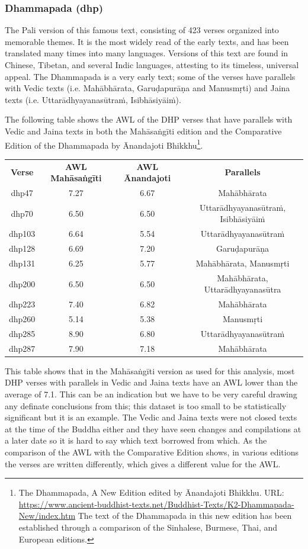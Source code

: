 \subsubsection{Dhammapada (dhp)}
The Pali version of this famous text, consisting of 423 verses organized into memorable themes. It is the most widely read of the early texts, and has been translated many times into many languages. Versions of this text are found in Chinese, Tibetan, and several Indic languages, attesting to its timeless, universal appeal. The Dhammapada is a very early text; some of the verses have parallels with Vedic texts (i.e. Mahābhārata, Garuḍapurāṇa and Manusmṛti) and Jaina texts (i.e. Uttarādhyayanasūtraṁ, Isibhāsiyāiṁ).

The following table shows the AWL of the DHP verses that have parallels with Vedic and Jaina texts in both the Mahāsaṅgīti edition and the Comparative Edition of the Dhammapada by Ānandajoti Bhikkhu\footnote{The Dhammapada, A New Edition edited by Ānandajoti Bhikkhu. URL: \url{https://www.ancient-buddhist-texts.net/Buddhist-Texts/K2-Dhammapada-New/index.htm} The text of the Dhammapada in this new edition has been established through a comparison of the Sinhalese, Burmese, Thai, and European editions.}.\\

\small
\begin{tabular}{ c c c c }
\textbf{Verse} & \textbf{AWL Mahāsaṅgīti} & \textbf{AWL Ānandajoti} & \textbf{Parallels} \\
dhp47 & 7.27 & 6.67 & Mahābhārata \\
dhp70 & 6.50 & 6.50 & Uttarādhyayanasūtraṁ, Isibhāsiyāiṁ \\
dhp103 & 6.64 & 5.54 & Uttarādhyayanasūtraṁ \\
dhp128 & 6.69 & 7.20 & Garuḍapurāṇa \\
dhp131 & 6.25 & 5.77 & Mahābhārata, Manusmṛti \\
dhp200 & 6.50 & 6.50 & Mahābhārata, Uttarādhyayanasūtra \\
dhp223 & 7.40 & 6.82 & Mahābhārata \\
dhp260 & 5.14 & 5.38 & Manusmṛti \\
dhp285 & 8.90 & 6.80 & Uttarādhyayanasūtraṁ \\
dhp287 & 7.90 & 7.18 & Mahābhārata
\end{tabular}

\normalsize
\medskip
This table shows that in the Mahāsaṅgīti version as used for this analysis, most DHP verses with parallels in Vedic and Jaina texts have an AWL lower than the average of 7.1. This can be an indication but we have to be very careful drawing any definate conclusions from this; this dataset is too small to be statistically significant but it is an example. The Vedic and Jaina texts were not closed texts at the time of the Buddha either and they have seen changes and compilations at a later date so it is hard to say which text borrowed from which. As the comparison of the AWL with the Comparative Edition shows, in various editions the verses are written differently, which gives a different value for the AWL.

